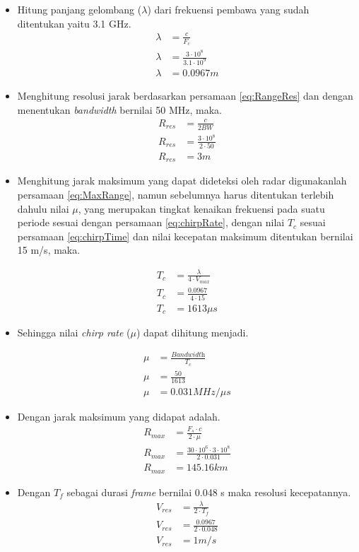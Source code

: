 \begin{itemize}
	\item Hitung panjang gelombang ($\lambda$) dari frekuensi pembawa yang sudah ditentukan yaitu 3.1 GHz.
	\begin{align*}
		\lambda &= \frac{c}{F_{c}}\\
		\lambda &= \frac{3 \cdot 10^{8}}{3.1 \cdot 10^{9}}\\
		\lambda &= 0.0967 m
	\end{align*}

	\item Menghitung resolusi jarak berdasarkan persamaan \ref{eq:RangeRes} dan dengan menentukan \textit{bandwidth} bernilai 50 MHz, maka.
		\begin{align*}
			R_{res} &= \frac{c}{2 BW} \\
			R_{res} &= \frac{3 \cdot 10^{8}}{2 \cdot 50}\\
			R_{res} &= 3 m
		\end{align*}
	\item Menghitung jarak maksimum yang dapat dideteksi oleh radar digunakanlah persamaan \ref{eq:MaxRange}, namun sebelumnya harus ditentukan terlebih dahulu nilai $\mu$, yang merupakan tingkat kenaikan frekuensi pada suatu periode sesuai dengan persamaan \ref{eq:chirpRate}, dengan nilai $T_{c}$ sesuai persamaan \ref{eq:chirpTime} dan nilai kecepatan maksimum ditentukan bernilai 15 m/s, maka.
	
	\begin{align*}
		T_{c} &= \frac{\lambda}{4 \cdot V_{max}}\\
		T_{c} &= \frac{0.0967}{4 \cdot 15}\\
		T_{c} &= 1613 \mu s
	\end{align*}

	\item 
	Sehingga nilai \textit{chirp rate} ($\mu$) dapat dihitung menjadi.

		\begin{align*}
		\mu &= \frac{\textit{Bandwidth}}{T_{c}}\\
		\mu &= \frac{\textit{50}}{1613}\\
		\mu &= 0.031 MHz/ \mu s
		\end{align*}

	\item 	
	Dengan jarak maksimum yang didapat adalah.
		\begin{align*}
		R_{max} &= \frac{F_{s} \cdot c}{2 \cdot \mu}\\
		R_{max} &= \frac{30 \cdot 10^{6} \cdot 3 \cdot 10^{8}}{2 \cdot 0.031}\\
		R_{max} &= 145.16 km
		\end{align*}

	\item 
	Dengan $T_{f}$ sebagai durasi \textit{frame} bernilai 0.048 s maka resolusi kecepatannya.
		\begin{align*}
			V_{res} &= \frac{\lambda}{2 \cdot T_{f}}\\
			V_{res} &= \frac{0.0967}{2 \cdot 0.048}\\
			V_{res} &= 1 m/s
		\end{align*}

\end{itemize}

